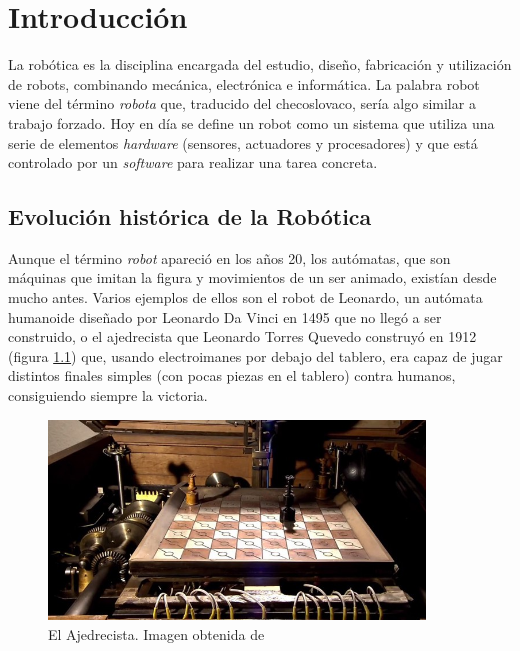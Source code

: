 \chapter{Introducción}
\label{cap:capitulo1}
\setcounter{page}{1}

La robótica es la disciplina encargada del estudio, diseño, fabricación y utilización de robots, combinando mecánica, electrónica e informática.
La palabra robot viene del término \textit{robota} que, traducido del checoslovaco, sería algo similar a trabajo forzado. Hoy en día se define un robot
como un sistema que utiliza una serie de elementos \textit{hardware} (sensores, actuadores y procesadores) y que está controlado por un \textit{software}
para realizar una tarea concreta.

\section{Evolución histórica de la Robótica}
\label{sec:robotica}

Aunque el término \textit{robot} apareció en los años 20, los autómatas, que son máquinas que imitan la figura y movimientos de un ser animado,
existían desde mucho antes. Varios ejemplos de ellos son el robot de Leonardo, un autómata humanoide diseñado por Leonardo Da Vinci en 1495 que
no llegó a ser construido, o el ajedrecista que Leonardo Torres Quevedo construyó en 1912 (figura \ref{fig:ajedrecista}) que, usando electroimanes por debajo del tablero,
era capaz de jugar distintos finales simples (con pocas piezas en el tablero) contra humanos, consiguiendo siempre la victoria.\\

\begin{figure} [H]
  \begin{center}
      \includegraphics[width=10cm]{figs/c1/ajedrecista.jpg}
  \end{center}
  \caption[El Ajedrecista]{El Ajedrecista. Imagen obtenida de \cite{ajedrecista}}
  \label{fig:ajedrecista}
\end{figure}

